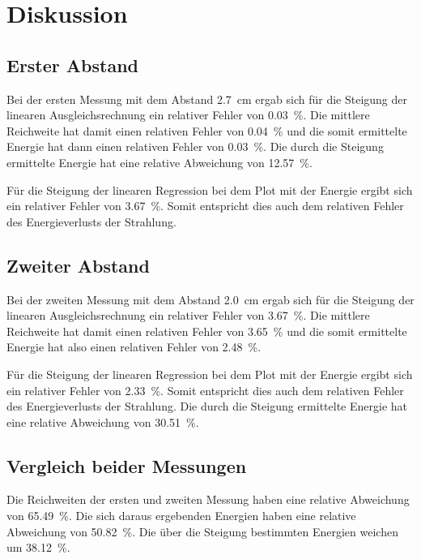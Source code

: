\section{Diskussion}
\label{sec:Diskussion}

\subsection{Erster Abstand}

Bei der ersten Messung mit dem Abstand \SI{2.7}{\centi\meter} ergab sich für die Steigung der linearen Ausgleichsrechnung ein relativer Fehler von \SI{0.03}{\percent}. Die mittlere Reichweite hat damit einen relativen Fehler von \SI{0.04}{\percent } und die somit ermittelte Energie hat dann einen relativen Fehler von \SI{0.03}{\percent}. Die durch die Steigung ermittelte Energie hat eine relative Abweichung von \SI{12.57}{\percent}. 

\noindent Für die Steigung der linearen Regression bei dem Plot mit der Energie ergibt sich ein relativer Fehler von \SI{3.67}{\percent}. Somit entspricht dies auch dem relativen Fehler des Energieverlusts der Strahlung. 

\subsection{Zweiter Abstand}

Bei der zweiten Messung mit dem Abstand \SI{2.0}{\centi\meter} ergab sich für die Steigung der linearen Ausgleichsrechnung ein relativer Fehler von \SI{3.67}{\percent}. Die mittlere Reichweite hat damit einen relativen Fehler von \SI{3.65}{\percent } und die somit ermittelte Energie hat also einen relativen Fehler von \SI{2.48}{\percent}. 

\noindent Für die Steigung der linearen Regression bei dem Plot mit der Energie ergibt sich ein relativer Fehler von \SI{2.33}{\percent}. Somit entspricht dies auch dem relativen Fehler des Energieverlusts der Strahlung. Die durch die Steigung ermittelte Energie hat eine relative Abweichung von \SI{30.51}{\percent}. 

\subsection{Vergleich beider Messungen}
Die Reichweiten der ersten und zweiten Messung haben eine relative Abweichung von \SI{65.49}{\percent}. Die sich daraus ergebenden Energien haben eine relative Abweichung von \SI{50.82}{\percent}. Die über die Steigung bestimmten Energien weichen um \SI{38.12}{\percent}.  

